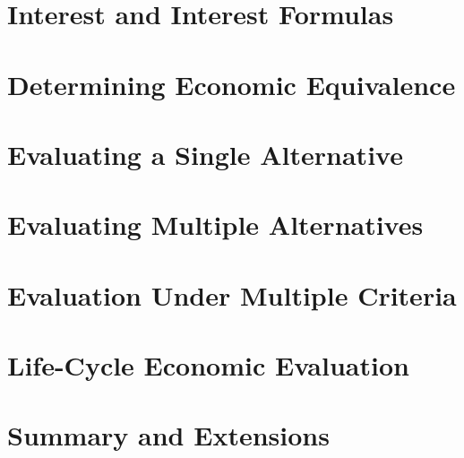 

\section{Interest and Interest Formulas}


\section{Determining Economic Equivalence}


\section{Evaluating a Single Alternative}


\section{Evaluating Multiple Alternatives}


\section{Evaluation Under Multiple Criteria}


\section{Life-Cycle Economic Evaluation}


\section{Summary and Extensions}


